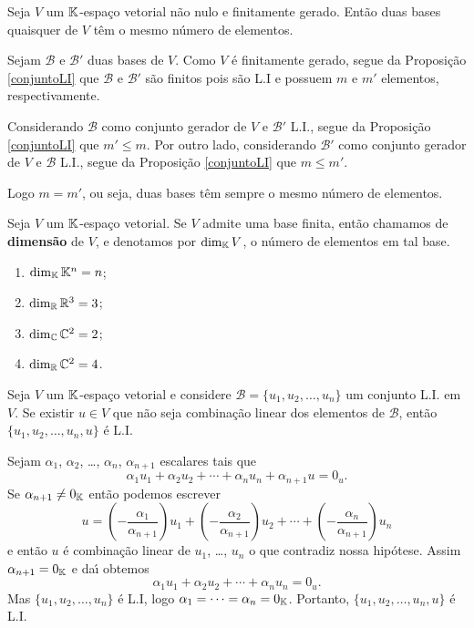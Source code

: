 \begin{corolario}
	Seja $V$ um $\mathbb{K}$-espa\c{c}o vetorial n\~ao nulo e finitamente gerado. Ent\~ao duas bases quaisquer de $V$ t\^em o mesmo n\'umero de elementos.
\end{corolario}
\begin{prova}
	Sejam $\mathcal{B}$ e $\mathcal{B}'$ duas bases de $V$. Como $V$ \'e finitamente gerado, segue da Proposi\c{c}\~ao \ref{conjuntoLI} que $\mathcal{B}$ e $\mathcal{B}'$ s\~ao finitos pois s\~ao L.I e possuem $m$ e $m'$ elementos, respectivamente.

	Considerando $\mathcal{B}$ como conjunto gerador de $V$ e $\mathcal{B}'$ L.I., segue da Proposi\c{c}\~ao \ref{conjuntoLI} que $m' \le m$. Por outro lado, considerando $\mathcal{B}'$ como conjunto gerador de $V$ e $\mathcal{B}$ L.I., segue da Proposi\c{c}\~ao \ref{conjuntoLI} que $m 
	\le m'$.

	Logo $m = m'$, ou seja, duas bases t\^em sempre o mesmo n\'umero de elementos.
\end{prova}

\begin{definicao}
	Seja $V$ um $\mathbb{K}$-espa\c{c}o vetorial. Se $V$ admite uma base finita, ent\~ao chamamos de \textbf{dimens\~ao} de $V$, e denotamos por $\dim_{\mathbb{K}} V$, o n\'umero de elementos em tal base.
\end{definicao}

\begin{exemplo}
	\begin{enumerate}[label={\arabic*})]
		\item $\dim_{\mathbb{K}}\mathbb{K}^n = n$;
		\item $\dim_{\mathbb{R}}\mathbb{R}^3 = 3$;
		\item $\dim_{\mathbb{C}}\mathbb{C}^2 = 2$;
		\item $\dim_{\mathbb{R}}\mathbb{C}^2 = 4$.
	\end{enumerate}
\end{exemplo}


\begin{proposicao}\label{ampliarconjuntoLI}
	Seja $V$ um $\mathbb{K}$-espa\c{c}o vetorial e considere $\mathcal{B} = \{u_1, u_2, \dots, u_n\}$ um conjunto L.I. em $V$. Se existir $u \in V$ que n\~ao seja combina\c{c}\~ao linear dos elementos de $\mathcal{B}$, ent\~ao $\{u_1, u_2, \dots, u_n, u\}$ \'e L.I.
\end{proposicao}
\begin{prova}
	Sejam $\alpha_1$, $\alpha_2$, \dots, $\alpha_n$, $\alpha_{n + 1}$ escalares tais que
	\[
		\alpha_1u_1 + \alpha_2u_2 + \cdots + \alpha_nu_n + \alpha_{n + 1}u = 0_u.
	\]
	Se $\alpha_{n + 1} \ne 0_{\mathbb{K}}$ ent\~ao podemos escrever
	\[
		u = \left(-\dfrac{\alpha_1}{\alpha_{n + 1}}\right)u_1 + \left(-\dfrac{\alpha_2}{\alpha_{n + 1}}\right)u_2 + \cdots + \left(-\dfrac{\alpha_n}{\alpha_{n + 1}}\right)u_n
	\]
	e ent\~ao $u$ \'e combina\c{c}\~ao linear de $u_1$, \dots, $u_n$ o que contradiz nossa hip\'otese. Assim $\alpha_{n + 1} = 0_{\mathbb{K}}$ e da{\'\i} obtemos
	\[
		\alpha_1u_1 + \alpha_2u_2 + \cdots + \alpha_nu_n = 0_u.
	\]
	Mas $\{u_1, u_2, \dots, u_n\}$ \'e L.I, logo $\alpha_1 = \cdots = \alpha_n = 0_{\mathbb{K}}$. Portanto, $\{u_1, u_2, \dots, u_n, u\}$ \'e L.I.
\end{prova}

